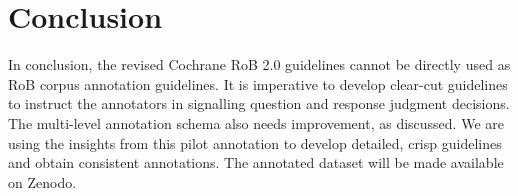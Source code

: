 \documentclass{IOS-Book-Article}
\begin{document}
\section{Conclusion}
\label{sec:conclusion}
%
In conclusion, the revised Cochrane RoB 2.0 guidelines cannot be directly used as RoB corpus annotation guidelines.
It is imperative to develop clear-cut guidelines to instruct the annotators in signalling question and response judgment decisions.
The multi-level annotation schema also needs improvement, as discussed.
We are using the insights from this pilot annotation to develop detailed, crisp guidelines and obtain consistent annotations. 
The annotated dataset will be made available on Zenodo.
%
%
%
 
%
%

%
\end{document}
